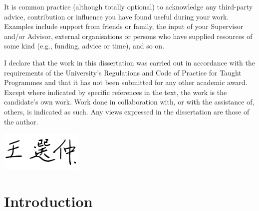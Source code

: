 \documentclass[
]{uob-thesis}
\begin{document}

\begin{acknowledgements}
It is common practice (although totally optional) to acknowledge any third-party advice, contribution or influence you have found useful during your work. Examples include support from friends or family, the input of your Supervisor and/or Advisor, external organisations or persons who have supplied resources of some kind (e.g., funding, advice or time), and so on.
\end{acknowledgements}

\begin{declaration}
  I declare that the work in this dissertation was carried out in accordance with the requirements of the University's Regulations and Code of Practice for Taught Programmes and that it has not been submitted for any other academic award. Except where indicated by specific references in the text, the work is the candidate's own work. Work done in collaboration with, or with the assistance of, others, is indicated as such. Any views expressed in the dissertation are those of the author.
  \vspace{2cm}

  \includegraphics[width=4cm]{sig} %
\end{declaration}




\frontmatter

\tableofcontents
\listoftables
\listoffigures



\mainmatter

\chapter{Introduction}
\end{document}
